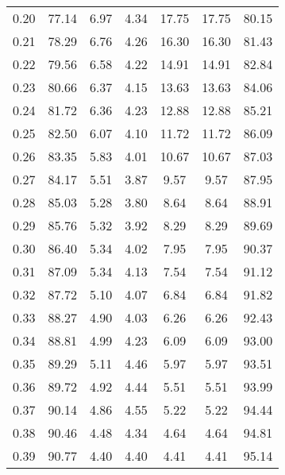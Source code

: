 \begin{tabular}{|c|c|c|c|c|c|c|}
      0.20 &     77.14 &      6.97 &       4.34 &   17.75 &      17.75 &         80.15 \\
      0.21 &     78.29 &      6.76 &       4.26 &   16.30 &      16.30 &         81.43 \\
      0.22 &     79.56 &      6.58 &       4.22 &   14.91 &      14.91 &         82.84 \\
      0.23 &     80.66 &      6.37 &       4.15 &   13.63 &      13.63 &         84.06 \\
      0.24 &     81.72 &      6.36 &       4.23 &   12.88 &      12.88 &         85.21 \\
      0.25 &     82.50 &      6.07 &       4.10 &   11.72 &      11.72 &         86.09 \\
      0.26 &     83.35 &      5.83 &       4.01 &   10.67 &      10.67 &         87.03 \\
      0.27 &     84.17 &      5.51 &       3.87 &    9.57 &       9.57 &         87.95 \\
      0.28 &     85.03 &      5.28 &       3.80 &    8.64 &       8.64 &         88.91 \\
      0.29 &     85.76 &      5.32 &       3.92 &    8.29 &       8.29 &         89.69 \\
      0.30 &     86.40 &      5.34 &       4.02 &    7.95 &       7.95 &         90.37 \\
      0.31 &     87.09 &      5.34 &       4.13 &    7.54 &       7.54 &         91.12 \\
      0.32 &     87.72 &      5.10 &       4.07 &    6.84 &       6.84 &         91.82 \\
      0.33 &     88.27 &      4.90 &       4.03 &    6.26 &       6.26 &         92.43 \\
      0.34 &     88.81 &      4.99 &       4.23 &    6.09 &       6.09 &         93.00 \\
      0.35 &     89.29 &      5.11 &       4.46 &    5.97 &       5.97 &         93.51 \\
      0.36 &     89.72 &      4.92 &       4.44 &    5.51 &       5.51 &         93.99 \\
      0.37 &     90.14 &      4.86 &       4.55 &    5.22 &       5.22 &         94.44 \\
      0.38 &     90.46 &      4.48 &       4.34 &    4.64 &       4.64 &         94.81 \\
      0.39 &     90.77 &      4.40 &       4.40 &    4.41 &       4.41 &         95.14 \\

\end{tabular}
